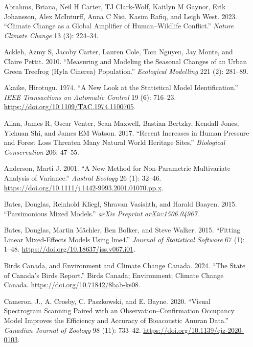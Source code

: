 \documentclass[
  letterpaper,
  DIV=11,
  numbers=noendperiod]{scrartcl}
\newlength{\cslhangindent}
\newenvironment{CSLReferences}[2] %
 {\begin{list}{}{%
  \setlength{\itemindent}{0pt}
  \setlength{\leftmargin}{0pt}
  \setlength{\parsep}{0pt}
  \ifodd #1
   \setlength{\leftmargin}{\cslhangindent}
   \setlength{\itemindent}{-1\cslhangindent}
  \fi
  \setlength{\itemsep}{#2\baselineskip}}}
 {\end{list}}
\begin{document}
\label{refs}
\begin{CSLReferences}{1}{0}
Abrahms, Briana, Neil H Carter, TJ Clark-Wolf, Kaitlyn M Gaynor, Erik
Johansson, Alex McInturff, Anna C Nisi, Kasim Rafiq, and Leigh West.
2023. {``Climate Change as a Global Amplifier of Human--Wildlife
Conflict.''} \emph{Nature Climate Change} 13 (3): 224--34.

Ackleh, Azmy S, Jacoby Carter, Lauren Cole, Tom Nguyen, Jay Monte, and
Claire Pettit. 2010. {``Measuring and Modeling the Seasonal Changes of
an Urban Green Treefrog (Hyla Cinerea) Population.''} \emph{Ecological
Modelling} 221 (2): 281--89.

Akaike, Hirotugu. 1974. {``A New Look at the Statistical Model
Identification.''} \emph{IEEE Transactions on Automatic Control} 19 (6):
716--23. \url{https://doi.org/10.1109/TAC.1974.1100705}.

Allan, James R, Oscar Venter, Sean Maxwell, Bastian Bertzky, Kendall
Jones, Yichuan Shi, and James EM Watson. 2017. {``Recent Increases in
Human Pressure and Forest Loss Threaten Many Natural World Heritage
Sites.''} \emph{Biological Conservation} 206: 47--55.

Anderson, Marti J. 2001. {``A New Method for Non-Parametric Multivariate
Analysis of Variance.''} \emph{Austral Ecology} 26 (1): 32--46.
\url{https://doi.org/10.1111/j.1442-9993.2001.01070.pp.x}.

Bates, Douglas, Reinhold Kliegl, Shravan Vasishth, and Harald Baayen.
2015. {``Parsimonious Mixed Models.''} \emph{arXiv Preprint
arXiv:1506.04967}.

Bates, Douglas, Martin Mächler, Ben Bolker, and Steve Walker. 2015.
{``Fitting Linear Mixed-Effects Models Using {lme4}.''} \emph{Journal of
Statistical Software} 67 (1): 1--48.
\url{https://doi.org/10.18637/jss.v067.i01}.

Birds Canada, and Environment and Climate Change Canada. 2024. {``The
State of Canada's Birds Report.''} Birds Canada; Environment; Climate
Change Canada. \url{https://doi.org/10.71842/8bab-ks08}.

Cameron, J., A. Crosby, C. Paszkowski, and E. Bayne. 2020. {``Visual
Spectrogram Scanning Paired with an Observation--Confirmation Occupancy
Model Improves the Efficiency and Accuracy of Bioacoustic Anuran
Data.''} \emph{Canadian Journal of Zoology} 98 (11): 733--42.
\url{https://doi.org/10.1139/cjz-2020-0103}.


\end{CSLReferences}
\end{document}
